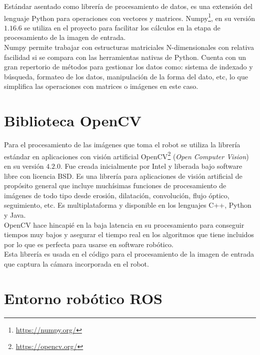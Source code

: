 Estándar asentado como librería de procesamiento de datos, es una extensión del lenguaje Python para operaciones con vectores y matrices. Numpy\footnote{\url{https://numpy.org/}}, en su versión $1.16.6$ se utiliza en el proyecto para facilitar los cálculos en la etapa de procesamiento de la imagen de entrada.\\

Numpy permite trabajar con estructuras matriciales N-dimensionales con relativa facilidad si se compara con las herramientas nativas de Python. Cuenta con un gran repertorio de métodos para gestionar los datos como: sistema de indexado y búsqueda, formateo de los datos, manipulación de la forma del dato, etc, lo que simplifica las operaciones con matrices o imágenes en este caso.

\section{Biblioteca OpenCV}\label{opencv}

Para el procesamiento de las imágenes que toma el robot se utiliza la librería estándar en aplicaciones con visión artificial OpenCV\footnote{\url{https://opencv.org/}} (\textit{Open Computer Vision}) en su versión $4.2.0$. Fue creada inicialmente por Intel y liberada bajo software libre con licencia BSD. Es una librería para aplicaciones de visión artificial de propósito general que incluye muchísimas funciones de procesamiento de imágenes de todo tipo desde erosión, dilatación, convolución, flujo óptico, seguimiento, etc. Es multiplataforma y disponible en los lenguajes C++, Python y Java.\\

OpenCV hace hincapié en la baja latencia en su procesamiento para conseguir tiempos muy bajos y asegurar el tiempo real en los algoritmos que tiene incluidos por lo que es perfecta para usarse en software robótico.\\

Esta librería es usada en el código para el procesamiento de la imagen de entrada que captura la cámara incorporada en el robot.

\section{Entorno robótico ROS}

